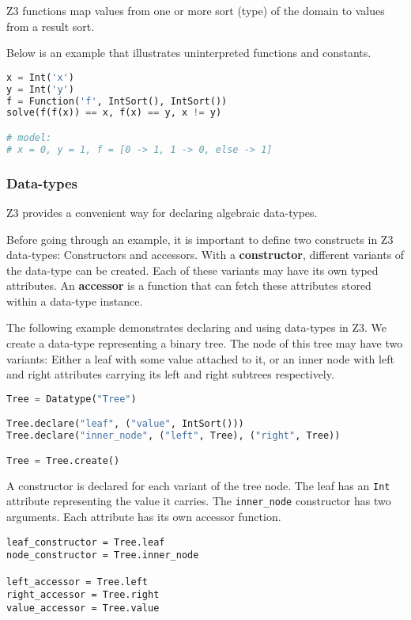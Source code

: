 Z3 functions map values from one or more sort (type) of the domain to values from a result sort.

Below is an example that illustrates uninterpreted functions and constants.

\begin{lstlisting}[language=python]
x = Int('x')
y = Int('y')
f = Function('f', IntSort(), IntSort())
solve(f(f(x)) == x, f(x) == y, x != y)

# model:
# x = 0, y = 1, f = [0 -> 1, 1 -> 0, else -> 1]
\end{lstlisting}

\subsubsection{Data-types}
Z3 provides a convenient way for declaring algebraic data-types.

Before going through an example, it is important to define two constructs in Z3 data-types: Constructors and accessors. With a \textbf{constructor}, different variants of the data-type can be created. Each of these variants may have its own typed attributes. An \textbf{accessor} is a function that can fetch these attributes stored within a data-type instance.

The following example demonstrates declaring and using data-types in Z3. We create a data-type representing a binary tree. The node of this tree may have two variants: Either a leaf with some value attached to it, or an inner node with left and right attributes carrying its left and right subtrees respectively.

\begin{lstlisting}[language=python]
Tree = Datatype("Tree")

Tree.declare("leaf", ("value", IntSort()))
Tree.declare("inner_node", ("left", Tree), ("right", Tree))

Tree = Tree.create()
\end{lstlisting}

A constructor is declared for each variant of the tree node. The leaf has an \lstinline|Int| attribute representing the value it carries. The \lstinline|inner_node| constructor has two arguments. Each attribute has its own accessor function.

\begin{lstlisting}
leaf_constructor = Tree.leaf
node_constructor = Tree.inner_node

left_accessor = Tree.left
right_accessor = Tree.right
value_accessor = Tree.value
\end{lstlisting}

